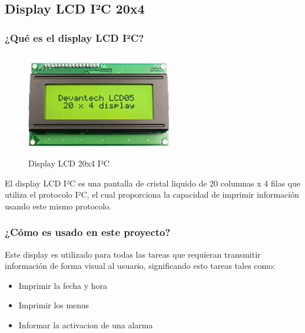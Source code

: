 \documentclass{article}
\begin{document}
			\clearpage
	\subsection{Display LCD I²C 20x4}
		\subsubsection{¿Qué es el display LCD I²C?}
		\begin{figure}
			\centering
			\includegraphics[width= 2.5in, keepaspectratio]{LCD_I2C.jpg}
			\caption{Display LCD 20x4 I²C}	
		\end{figure}
		El display LCD I²C es una pantalla de cristal liquido de 20 columnas x 4 filas que
		utiliza el protocolo I²C, el cual proporciona la capacidad de imprimir información
		usando este mismo protocolo.  

		\subsubsection{¿Cómo es usado en este proyecto?}
		Este display es utilizado para todas las tareas que requieran transmitir 
		información de forma visual
		al usuario, significando esto tareas tales como:
		\begin{itemize}
			\item Imprimir la fecha y hora
			\item Imprimir los menus
			\item Informar la activacion de una alarma
		\end{itemize}
			
	
\end{document}
